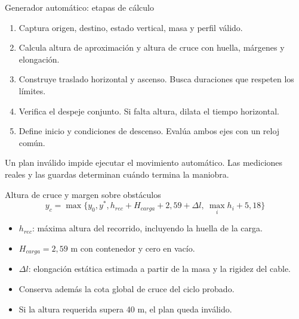 \documentclass[aspectratio=169,11pt]{beamer}
\begin{document}
\begin{frame}[t,label=generadoralgoritmo]{Generador automático: etapas de cálculo}
\begin{enumerate}
\item Captura origen, destino, estado vertical, masa y perfil válido.
\item Calcula altura de aproximación y altura de cruce con huella, márgenes y elongación.
\item Construye traslado horizontal y ascenso. Busca duraciones que respeten los límites.
\item Verifica el despeje conjunto. Si falta altura, dilata el tiempo horizontal.
\item Define inicio y condiciones de descenso. Evalúa ambos ejes con un reloj común.
\end{enumerate}
\small Un plan inválido impide ejecutar el movimiento automático. Las mediciones reales y las guardas determinan cuándo termina la maniobra.
\end{frame}


\begin{frame}[t,label=trayectoria1]{Altura de cruce y margen sobre obstáculos}
\[
y_c=\max\{y_0,y^*,h_{rec}+H_{carga}+2{,}59+\Delta l,\ \max_i h_i+5{,}18\}
\]
\begin{itemize}
\item $h_{rec}$: máxima altura del recorrido, incluyendo la huella de la carga.
\item $H_{carga}=2{,}59$ m con contenedor y cero en vacío.
\item $\Delta l$: elongación estática estimada a partir de la masa y la rigidez del cable.
\item Conserva además la cota global de cruce del ciclo probado.
\item Si la altura requerida supera 40 m, el plan queda inválido.
\end{itemize}

\end{frame}
\end{document}
